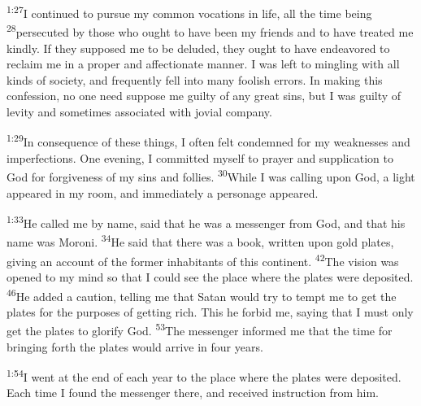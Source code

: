 \documentclass[openany,12pt,english]{book}
\newenvironment{para}{\par\pretolerance=100\tolerance=200\setlength{\emergencystretch}{0.6em}\relax}{\par}
\begin{document}
\bigskip{}

\begin{para}
    \textsuperscript{1:27}\thinspace{}I con\-tin\-ued to pur\-sue my com\-mon vocations in life, all the time be\-ing
    \textsuperscript{28}\thinspace{}per\-se\-cut\-ed by those who ought to have been my friends and to have treated me kind\-ly. If they sup\-posed me to be de\-lud\-ed, they ought to have endeavored to re\-claim me in a prop\-er and af\-fec\-tion\-ate man\-ner. I was left to mingling with all kinds of so\-ci\-e\-ty, and fre\-quent\-ly fell in\-to man\-y fool\-ish errors. In mak\-ing this con\-fes\-sion, no one need sup\-pose me guilt\-y of any great sins, but I was guilt\-y of lev\-i\-ty and some\-times as\-so\-ci\-at\-ed with jo\-vi\-al com\-pa\-ny.
\end{para}

\begin{para}
    \textsuperscript{1:29}\thinspace{}In con\-se\-quence of these things, I of\-ten felt condemned for my weaknesses and imperfections. One eve\-ning, I com\-mit\-ted my\-self to pray\-er and sup\-pli\-ca\-tion to God for for\-give\-ness of my sins and follies.
    \textsuperscript{30}\thinspace{}While I was call\-ing up\-on God, a light appeared in my room, and im\-me\-di\-ate\-ly a per\-son\-age appeared.
\end{para}

\begin{para}
    \textsuperscript{1:33}\thinspace{}He called me by name, said that he was a mes\-sen\-ger from God, and that his name was Moroni.
    \textsuperscript{34}\thinspace{}He said that there was a book, writ\-ten up\-on gold plates, giv\-ing an ac\-count of the for\-mer inhabitants of this con\-ti\-nent.
    \textsuperscript{42}\thinspace{}The vi\-sion was opened to my mind so that I could see the place where the plates were deposited.
    \textsuperscript{46}\thinspace{}He added a cau\-tion, tell\-ing me that Satan would try to tempt me to get the plates for the purposes of get\-ting rich. This he for\-bid me, say\-ing that I must on\-ly get the plates to glo\-ri\-fy God.
    \textsuperscript{53}\thinspace{}The mes\-sen\-ger in\-formed me that the time for bring\-ing forth the plates would ar\-rive in four years.
\end{para}

\bigskip{}

\begin{para}
    \textsuperscript{1:54}\thinspace{}I went at the end of each year to the place where the plates were deposited. Each time I found the mes\-sen\-ger there, and re\-ceived in\-struc\-tion from him.
\end{para}
\end{document}
